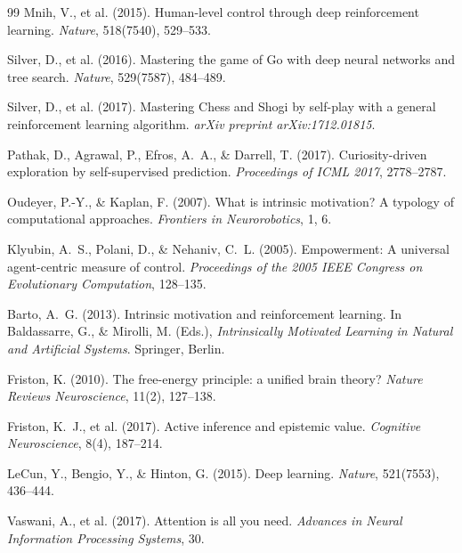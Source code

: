 \documentclass[12pt,a4paper]{article}
\begin{document}
\begin{thebibliography}{99}
Mnih, V., et al. (2015).
Human-level control through deep reinforcement learning.
\textit{Nature}, 518(7540), 529--533.

Silver, D., et al. (2016).
Mastering the game of Go with deep neural networks and tree search.
\textit{Nature}, 529(7587), 484--489.

Silver, D., et al. (2017).
Mastering Chess and Shogi by self-play with a general reinforcement learning
algorithm.
\textit{arXiv preprint arXiv:1712.01815}.


Pathak, D., Agrawal, P., Efros, A.~A., \& Darrell, T. (2017).
Curiosity-driven exploration by self-supervised prediction.
\textit{Proceedings of ICML 2017}, 2778--2787.

Oudeyer, P.-Y., \& Kaplan, F. (2007).
What is intrinsic motivation? A typology of computational approaches.
\textit{Frontiers in Neurorobotics}, 1, 6.

Klyubin, A.~S., Polani, D., \& Nehaniv, C.~L. (2005).
Empowerment: A universal agent-centric measure of control.
\textit{Proceedings of the 2005 IEEE Congress on Evolutionary Computation},
128--135.

Barto, A.~G. (2013).
Intrinsic motivation and reinforcement learning.
In Baldassarre, G., \& Mirolli, M. (Eds.),
\textit{Intrinsically Motivated Learning in Natural and Artificial Systems}.
Springer, Berlin.


Friston, K. (2010).
The free-energy principle: a unified brain theory?
\textit{Nature Reviews Neuroscience}, 11(2), 127--138.

Friston, K.~J., et al. (2017).
Active inference and epistemic value.
\textit{Cognitive Neuroscience}, 8(4), 187--214.


LeCun, Y., Bengio, Y., \& Hinton, G. (2015).
Deep learning.
\textit{Nature}, 521(7553), 436--444.

Vaswani, A., et al. (2017).
Attention is all you need.
\textit{Advances in Neural Information Processing Systems}, 30.


\end{thebibliography}
\end{document}
